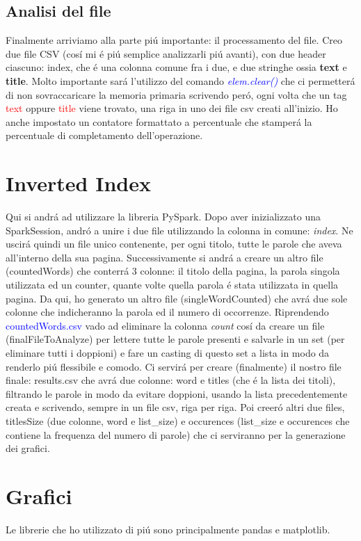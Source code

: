 \documentclass[12pt,a4paper]{article}
\begin{document}
    \subsection{Analisi del file}
    Finalmente arriviamo alla parte piú importante: il processamento del file.
    \newline
    Creo due file CSV (cosí mi é piú semplice analizzarli piú avanti), con due header ciascuno: index, che é una colonna comune fra i due, e due stringhe ossia \textbf{text} e \textbf{title}. Molto importante sará l'utilizzo del comando \textit{\textcolor{blue}{elem.clear()}} che ci permetterá di non sovraccaricare la memoria primaria scrivendo peró, ogni volta che un tag \textcolor{red}{text} oppure \textcolor{red}{title} viene trovato, una riga in uno dei file csv creati all'inizio.
    \newline
    Ho anche impostato un contatore formattato a percentuale che stamperá la percentuale di completamento dell'operazione.
    \section{Inverted Index}
    Qui si andrá ad utilizzare la libreria PySpark. Dopo aver inizializzato una SparkSession, andró a unire i due file utilizzando la colonna in comune: \textit{index}. Ne uscirá quindi un file unico contenente, per ogni titolo, tutte le parole che aveva all'interno della sua pagina. Successivamente si andrá a creare un altro file (countedWords) che conterrá 3 colonne: il titolo della pagina, la parola singola utilizzata ed un counter, quante volte quella parola é stata utilizzata in quella pagina.
    Da qui, ho generato un altro file (singleWordCounted) che avrá due sole colonne che indicheranno la parola ed il numero di occorrenze.
    Riprendendo \textcolor{blue}{countedWords.csv} vado ad eliminare la colonna \textit{count} cosí da creare un file (finalFileToAnalyze) per lettere tutte le parole presenti e salvarle in un set (per eliminare tutti i doppioni) e fare un casting di questo set a lista in modo da renderlo piú flessibile e comodo.
    \newline
    Ci servirá per creare (finalmente) il nostro file finale: results.csv che avrá due colonne: word e titles (che é la lista dei titoli), filtrando le parole in modo da evitare doppioni, usando la lista precedentemente creata e scrivendo, sempre in un file csv, riga per riga.
    \newline
    Poi creeró altri due files, titlesSize (due colonne, word e list\_size) e occurences (list\_size e occurences che contiene la frequenza del numero di parole) che ci serviranno per la generazione dei grafici.
    \section{Grafici}
    Le librerie che ho utilizzato di piú sono principalmente pandas e matplotlib.
\end{document}

